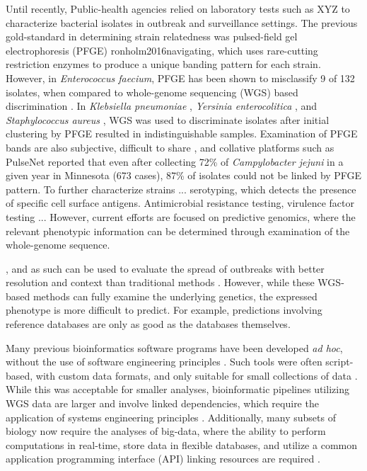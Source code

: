 \documentclass[a4,center,fleqn]{NAR}
\begin{document}
Until recently, Public-health agencies relied on laboratory tests such as XYZ to characterize bacterial isolates in outbreak and surveillance settings.
The previous gold-standard in determining strain relatedness was pulsed-field gel electrophoresis (PFGE) {ronholm2016navigating}, which uses rare-cutting restriction enzymes to produce a unique banding pattern for each strain.
However, in \textit{Enterococcus faecium}, PFGE has been shown to misclassify 9 of 132 isolates, when compared to whole-genome sequencing (WGS) based discrimination \cite{pinholt2015multiple}.
In \textit{Klebsiella pneumoniae} \cite{marsh2015genomic}, \textit{Yersinia enterocolitica} \cite{gilpin2014limitations}, and \textit{Staphylococcus aureus} \cite{doi:10.1093/ofid/ofu096}, WGS was used to discriminate isolates after initial clustering by PFGE resulted in indistinguishable samples.
Examination of PFGE bands are also subjective, difficult to share \cite{lytsy2017time}, and collative platforms such as PulseNet reported \cite{gilpin2014limitations} that even after collecting 72\% of \textit{Campylobacter jejuni} in a given year in Minnesota (673 cases), 87\% of isolates could not be linked by PFGE pattern.
To further characterize strains ... serotyping, which detects the presence of specific cell surface antigens.
Antimicrobial resistance testing, virulence factor testing ...
However, current efforts are focused on predictive genomics, where the relevant phenotypic information can be determined through examination of the whole-genome sequence. 

, and as such can be used to evaluate the spread of outbreaks with better resolution and context than traditional methods \cite{ronholm2016navigating}.
However, while these WGS-based methods can fully examine the underlying genetics, the expressed phenotype is more difficult to predict.
For example, predictions involving reference databases are only as good as the databases themselves.


Many previous bioinformatics software programs have been developed \textit{ad hoc}, without the use of software engineering principles \cite{de2015trends}.
Such tools were often script-based, with custom data formats, and only suitable for small collections of data \cite{de2015trends}.
While this was acceptable for smaller analyses, bioinformatic pipelines utilizing WGS data are larger and involve linked dependencies, which require the application of systems engineering principles \cite{schatz2015biological}.
Additionally, many subsets of biology now require the analyses of big-data, where the ability to perform computations in real-time, store data in flexible databases, and utilize a common application programming interface (API) linking resources are required \cite{swaminathan2016review}.
\end{document}
